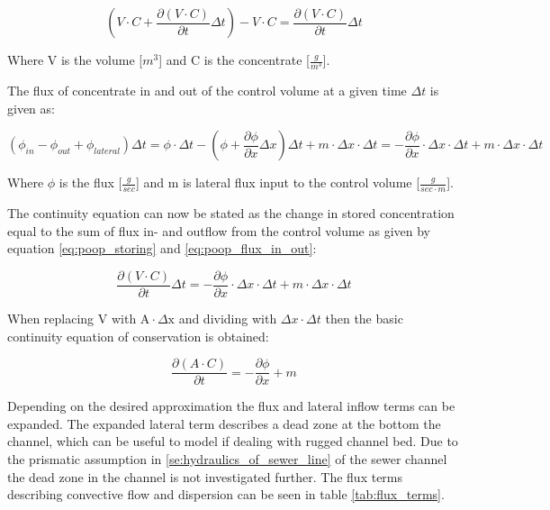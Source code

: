 \begin{equation}
 \left(V \cdot C + \frac{\partial (V\cdot C)}{\partial t} \Delta t \right) - V\cdot C = \frac{\partial (V\cdot C)}{\partial t}\Delta t
\label{eq:poop_storing}
\end{equation}

Where V is the volume [$m^3$] and C is the concentrate [$\frac{g}{m^3}$]. 

The flux of concentrate in and out of the control volume at a given time $\Delta t$ is given as:


 \begin{equation}
  	\left( \phi_{in} - \phi_{out} + \phi_{lateral} \right) \Delta t   =	\phi \cdot \Delta t - \left(\phi + \frac{\partial \phi}{\partial x}\Delta x \right) \Delta t + m \cdot \Delta x \cdot \Delta t = - \frac{\partial \phi}{\partial x}\cdot \Delta x \cdot \Delta t +m \cdot \Delta x \cdot \Delta t  
  \label{eq:poop_flux_in_out}
  \end{equation} 



Where $\phi$ is the flux [$\frac{g}{sec}$] and m is lateral flux input to the control volume [$\frac{g}{sec\cdot m}$].

The continuity equation can now be stated as the change in stored concentration equal to the sum of flux in- and outflow from the control volume as given by equation \ref{eq:poop_storing} and \ref{eq:poop_flux_in_out}:

\begin{equation}
	\frac{\partial (V\cdot C)}{\partial t}\Delta t = - \frac{\partial \phi}{\partial x}\cdot \Delta x \cdot \Delta t +m \cdot \Delta x \cdot \Delta t
\end{equation}

When replacing V with $\text{A}\cdot \Delta \text{x}$ and dividing with $\Delta x \cdot  \Delta t$ then the basic continuity equation of conservation is obtained:

\begin{equation}
	\frac{\partial (A\cdot C)}{\partial t} = - \frac{\partial \phi}{\partial x} + m 
\label{eq:concentrate_continuity_equation}
\end{equation}

Depending on the desired approximation the flux and lateral inflow terms can be expanded. The expanded lateral term describes a dead zone at the bottom the channel, which can be useful to model if dealing with rugged channel bed. Due to the prismatic assumption in \ref{se:hydraulics_of_sewer_line} of the sewer channel the dead zone in the channel is not investigated further. The flux terms describing convective flow and dispersion can be seen in table \ref{tab:flux_terms}.  

